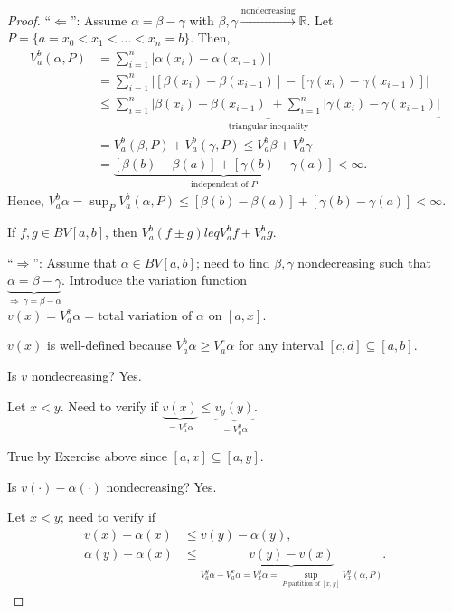 \documentclass[letterpaper, reqno,11pt]{article}
\newcommand{\RR}{\mathbb{R}}
\begin{document}
\begin{proof}
  ``$\Leftarrow$'': Assume $\alpha = \beta - \gamma$ with $\beta, \gamma \xrightarrow{\text{nondecreasing}} \RR$. Let $P = \{ a = x_0 < x_1 < \ldots < x_n = b \}$. Then,
  \begin{align*}
    V_a^b (\alpha, P) &= \sum_{i = 1}^n |\alpha(x_i) - \alpha(x_{i - 1})| \\
    &= \sum_{i = 1}^n |[\beta(x_i) - \beta(x_{i - 1})] - [\gamma(x_i) - \gamma(x_{i - 1})]| \\
    &\underbrace{\leq \sum_{i = 1}^n |\beta(x_i) - \beta(x_{i - 1})| + \sum_{i = 1}^n |\gamma(x_i) - \gamma(x_{i - 1})|}_\text{triangular inequality} \\
    &= V_a^b (\beta, P) + V_a^b (\gamma, P) \leq V_a^b \beta + V_a^b \gamma \\
    &= \underbrace{[\beta(b) - \beta(a)] + [\gamma(b) - \gamma(a)]}_\text{independent of $P$} < \infty.
  \end{align*}
  Hence, $V_a^b \alpha = \sup_P V_a^b (\alpha, P) \leq [\beta(b) - \beta(a)] + [\gamma(b) - \gamma(a)] < \infty$.

  \medskip

   If $f, g \in BV[a, b]$, then $V_a^b (f \pm g) leq V_a^b f + V_a^b g$.

  \medskip

  ``$\Rightarrow$'': Assume that $\alpha \in BV[a, b]$; need to find $\beta, \gamma$ nondecreasing such that $\underbrace{\alpha = \beta - \gamma}_{\Rightarrow ~ \gamma = \beta - \alpha}$. Introduce the variation function $v(x) = V_a^x \alpha = \text{total variation of $\alpha$ on $[a, x]$}$.

  \medskip

   $v(x)$ is well-defined because $V_a^b \alpha \geq V_a^c \alpha$ for any interval $[c, d] \subseteq [a, b]$.

  \medskip

   Is $v$ nondecreasing? Yes.

  Let $x < y$. Need to verify if $\underbrace{v(x)}_{= V_a^x \alpha} \leq \underbrace{v_y(y)}_{= V_a^y \alpha}$.

  True by Exercise above since $[a, x] \subseteq [a, y]$.

  \medskip

   Is $v(\cdot) - \alpha(\cdot)$ nondecreasing? Yes.

  Let $x < y$; need to verify if
  \begin{align*}
    v(x) - \alpha(x) &\leq v(y) - \alpha(y), \\
    \alpha(y) - \alpha(x) &\leq \underbrace{v(y) - v(x)}_{V_a^y \alpha - V_a^x \alpha = V_x^y \alpha = \sup_\text{$P$ partition of $[x, y]$} V_x^y (\alpha, P)}.
  \end{align*}


\end{proof}
\end{document}
